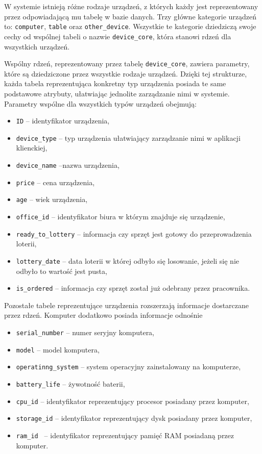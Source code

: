 W systemie istnieją różne rodzaje urządzeń, z których każdy jest reprezentowany przez odpowiadającą mu tabelę w bazie danych. Trzy główne kategorie urządzeń to: \texttt{computer}, \texttt{table} oraz \texttt{other\_device}. Wszystkie te kategorie dziedziczą swoje cechy od wspólnej tabeli o nazwie \texttt{device\_core}, która stanowi rdzeń dla wszystkich urządzeń.

Wspólny rdzeń, reprezentowany przez tabelę \texttt{device\_core}, zawiera parametry, które są dziedziczone przez wszystkie rodzaje urządzeń. Dzięki tej strukturze, każda tabela reprezentująca konkretny typ urządzenia posiada te same podstawowe atrybuty, ułatwiając jednolite zarządzanie nimi w systemie. Parametry wspólne dla wszystkich typów urządzeń obejmują: 
\begin{itemize}
	\item \texttt{ID} -- identyfikator urządzenia,
	\item \texttt{device\_type} -- typ urządzenia ułatwiający zarządzanie nimi w aplikacji klienckiej,
	\item \texttt{device\_name} --nazwa urządzenia,
	\item \texttt{price} -- cena urządzenia,
	\item \texttt{age} -- wiek urządzenia,
	\item \texttt{office\_id} -- identyfikator biura w którym znajduje się urządzenie,
	\item \texttt{ready\_to\_lottery} -- informacja czy sprzęt jest gotowy do przeprowadzenia loterii,
	\item \texttt{lottery\_date} -- data loterii w której odbyło się losowanie, jeżeli się nie odbyło to wartość jest pusta,
	\item \texttt{is\_ordered} -- informacja czy sprzęt został już odebrany przez pracownika.
\end{itemize}

Pozostałe tabele reprezentujące urządzenia rozszerzają informacje dostarczane przez rdzeń. Komputer dodatkowo posiada informacje odnośnie
\begin{itemize}
	\item \texttt{serial\_number} -- numer seryjny komputera,
	\item \texttt{model} -- model komputera,
	\item \texttt{operatinng\_system} -- system operacyjny zainstalowany na komputerze,
	\item \texttt{battery\_life} -- żywotność baterii,
	\item \texttt{cpu\_id} -- identyfikator reprezentujący procesor posiadany przez komputer,
	\item \texttt{storage\_id} -- identyfikator reprezentujący dysk posiadany przez komputer,
	\item \texttt{ram\_id } -- identyfikator reprezentujący pamięć RAM posiadaną przez komputer.
\end{itemize}


